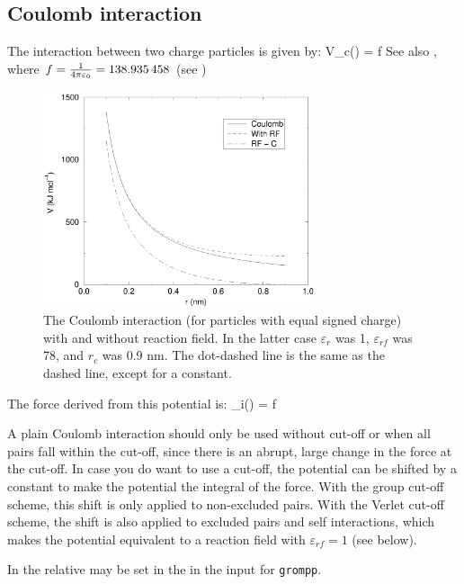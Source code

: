 \subsection{Coulomb interaction}
\label{sec:coul}
\newcommand{\epsr}{\varepsilon_r}
\newcommand{\epsrf}{\varepsilon_{rf}}
The  interaction between two charge particles is given by:
\beq
V_c(\rij) = f \frac{q_i q_j}{\epsr \rij}
\label{eqn:vcoul}
\eeq
See also , where $f = \frac{1}{4\pi \varepsilon_0} =
\electricConvFactorValue$ (see )

\begin{figure}
\centerline{\includegraphics[width=8cm]{plots/vcrf}}
\caption[The Coulomb interaction with and without reaction field.]{The
Coulomb interaction (for particles with equal signed charge) with and
without reaction field. In the latter case $\epsr$ was 1, $\epsrf$ was 78,
and $r_c$ was 0.9 nm.
The dot-dashed line is the same as the dashed line, except for a constant.}
\label{fig:coul}
\end{figure}

The force derived from this potential is:
\beq
{}_i(\rvij) = f \frac{q_i q_j}{\epsr\rij^2}\rnorm
\eeq

A plain Coulomb interaction should only be used without cut-off or when all pairs fall within the cut-off, since there is an abrupt, large change in the force at the cut-off. In case you do want to use a cut-off, the potential can be shifted by a constant to make the potential the integral of the force. With the group cut-off scheme, this shift is only applied to non-excluded pairs. With the Verlet cut-off scheme, the shift is also applied to excluded pairs and self interactions, which makes the potential equivalent to a reaction field with $\epsrf=1$ (see below).

In {\gromacs} the  relative  
\normindex{$\epsr$}
may be set in the in the input for {\tt grompp}. 

